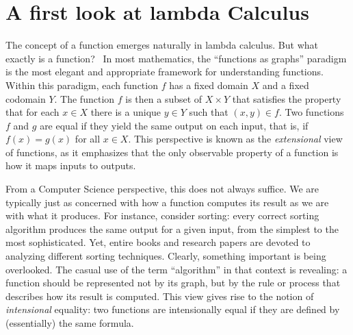  



\section{A first look at lambda Calculus}





The concept of a function emerges naturally in lambda calculus. But what exactly is a function?  In most mathematics, the ``functions as graphs'' paradigm is the most elegant and appropriate framework for understanding functions. Within this paradigm, each function $f$ has a fixed domain $X$ and a fixed codomain $Y$. The function $f$ is then a subset of $X \times Y$ that satisfies the property that for each $x \in X$ there is a unique $y \in Y$ such that $(x,y) \in f$. Two functions $f$ and $g$ are equal if they yield the same output on each input, that is, if $f(x) = g(x)$ for all $x \in X$. This perspective is known as the \emph{extensional} view of functions, as it emphasizes that the only observable property of a function is how it maps inputs to outputs.

From a Computer Science perspective, this does not always suffice. We are typically just as concerned with how a function computes its result as we are with what it produces. For instance, consider sorting: every correct sorting algorithm produces the same output for a given input, from the simplest to the most sophisticated. Yet, entire books and research papers are devoted to analyzing different sorting techniques. Clearly, something important is being overlooked. The casual use of the term ``algorithm'' in that context is revealing: a function should be represented not by its graph, but by the rule or process that describes how its result is computed. This view gives rise to the notion of \emph{intensional} equality: two functions are intensionally equal if they are defined by (essentially) the same formula.

